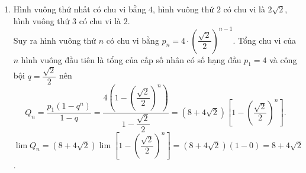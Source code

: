 \begin{bt}
{\begin{enumerate}
			\[ S_n=\dfrac{a_1\left(1-q^n\right)}{1-q}=\dfrac{1-\left(\dfrac{1}{2}\right)^n}{1-\dfrac{1}{2}}=2\left[1-\left(\dfrac{1}{2}\right)^n\right].\]
			$\lim S_n=\lim 2\left[1-\left(\dfrac{1}{2}\right)^n\right]=2 \left[\lim 1-\lim \left(\dfrac{1}{2}\right)^n\right]=2 $.
			\item Hình vuông thứ nhất có chu vi bằng $4$, hình vuông thứ $2$ có chu vi là $2\sqrt{2}$, hình vuông thứ $3$ có chu vi là $2$.\\
			Suy ra hình vuông thứ $n$ có chu vi bằng $p_n=4\cdot \left(\dfrac{\sqrt{2}}{2}\right)^{n-1}$.
			Tổng chu vi của $n$ hình vuông đầu tiên là tổng của cấp số nhân có  số hạng đầu $p_1=4$ và công bội $q=\dfrac{\sqrt{2}}{2}$ nên 
			\[ Q_n=\dfrac{p_1\left(1-q^n\right)}{1-q}=\dfrac{4\left(1-\left(\dfrac{\sqrt{2}}{2}\right)^n\right)}{1-\dfrac{\sqrt{2}}{2}}=\left(8+4\sqrt{2}\right)\left[1-\left(\dfrac{\sqrt{2}}{2}\right)^n\right].\]
			$\lim Q_n=\left(8+4\sqrt{2}\right)\lim \left[1-\left(\dfrac{\sqrt{2}}{2}\right)^n\right]=\left(8+4\sqrt{2}\right)\left(1-0\right)=8+4\sqrt{2}$.
		\end{enumerate}	
	}
\end{bt}

